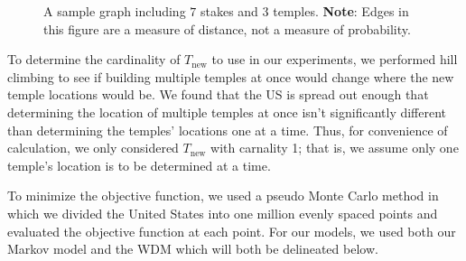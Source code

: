 \documentclass[twoside,twocolumn]{article}
\begin{document}
\begin{figure}[h!]
\centering
{}
\caption{A sample graph including $7$ stakes and $3$ temples. \textbf{Note}: Edges in this figure are a measure of distance, not a measure of probability.} %
\label{fig:M1}
\end{figure}

To determine the cardinality of $T_{\text{new}}$ to use in our experiments, we performed hill climbing to see if building multiple temples at once would change where the new temple locations would be.
We found that the US is spread out enough that determining the location of multiple temples at once isn't significantly different than determining the temples' locations one at a time.
Thus, for convenience of calculation, we only considered $T_{\text{new}}$ with carnality 1;
that is, we assume only one temple's location is to be determined at a time.

To minimize the objective function, we used a pseudo Monte Carlo method in which we divided the United States into one million evenly spaced points and evaluated the objective function at each point.
For our models, we used both our Markov model and the WDM which will both be delineated below.
\end{document}
